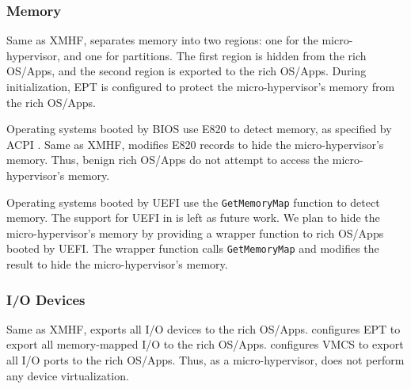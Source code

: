 \subsubsection{Memory}

Same as XMHF,  separates memory into two regions: one for the micro-hypervisor, and one for  partitions. The first region is hidden from the rich OS/Apps, and the second region is exported to the rich OS/Apps. During  initialization, EPT is configured to protect the micro-hypervisor's memory from the rich OS/Apps.

Operating systems booted by BIOS use E820 to detect memory, as specified by ACPI \cite{acpi_spec}. Same as XMHF,  modifies E820 records to hide the micro-hypervisor's memory. Thus, benign rich OS/Apps do not attempt to access the micro-hypervisor's memory.

Operating systems booted by UEFI use the \lstinline{GetMemoryMap} function to detect memory. The support for UEFI in  is left as future work. We plan to hide the micro-hypervisor's memory by providing a wrapper function to rich OS/Apps booted by UEFI. The wrapper function calls \lstinline{GetMemoryMap} and modifies the result to hide the micro-hypervisor's memory.

\subsubsection{I/O Devices}

Same as XMHF,  exports all I/O devices to the rich OS/Apps.  configures EPT to export all memory-mapped I/O to the rich OS/Apps.  configures VMCS to export all I/O ports to the rich OS/Apps. Thus, as a micro-hypervisor,  does not perform any device virtualization.

